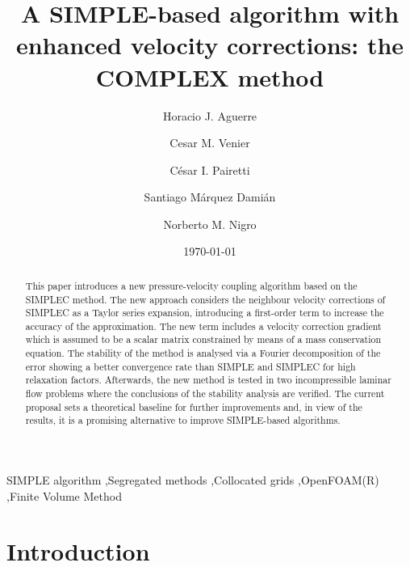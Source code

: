 \documentclass[final,3p,times,11pt,onecolumn]{myElsarticle}
\date{\today}
\numberwithin{equation}{section}
\begin{document}
\begin{frontmatter}

\title{A SIMPLE-based algorithm with enhanced velocity corrections: the COMPLEX method}
 
\author[a]{Horacio J. Aguerre}
\author[a,b]{Cesar M. Venier}
\author[b,a]{C\'{e}sar I. Pairetti}
\author[a,c]{Santiago M\'{a}rquez Dami\'{a}n}
\author[a,d]{Norberto M. Nigro}

\address[a]{Centro de Investigación de Métodos Computacionales, CONICET-UNL, Santa Fe, Argentina}
\address[b]{Escuela de Ingeniería Mecánica, Facultad de Ciencias Exactas, Ingeniería y Agrimensura, Universidad Nacional de Rosario, Rosario, Argentina}
\address[c]{Facultad Regional Santa Fe, Universidad Tecnológica Nacional, Santa Fe, Argentina}
\address[d]{Facultad de Ingeniería y Ciencias Hídricas, Universidad Nacional del Litoral, Santa Fe, Argentina}

\begin{abstract}
This paper introduces a new pressure-velocity coupling algorithm based on the SIMPLEC method. The new approach considers the neighbour velocity corrections of SIMPLEC as a Taylor series expansion, introducing a first-order term to increase the accuracy of the approximation. The new term includes a velocity correction gradient which is assumed to be a scalar matrix constrained by means of a mass conservation equation.
The stability of the method is analysed via a Fourier decomposition of the error showing a better convergence rate than SIMPLE and SIMPLEC for high relaxation factors. Afterwards, the new method is tested in two incompressible laminar flow problems where the conclusions of the stability analysis are verified. The current proposal sets a theoretical baseline for further improvements and, in view of the results, it is a promising alternative to improve SIMPLE-based algorithms.
\end{abstract}

\begin{keyword}
SIMPLE algorithm \sep Segregated methods \sep Collocated grids
\sep OpenFOAM(R) \sep Finite Volume Method 
\end{keyword}
\end{frontmatter}

\linenumbers
\section{Introduction}
\end{document}
